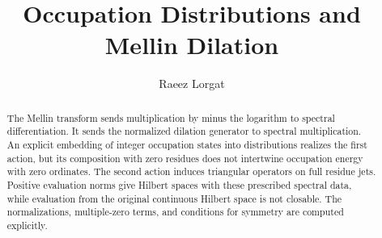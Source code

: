 \documentclass[11pt]{memoir}
\title{Occupation Distributions and Mellin Dilation}
\author{Raeez Lorgat}
\date{}
\begin{document}
\maketitle
\begin{abstract}
The Mellin transform sends multiplication by minus the logarithm to
spectral differentiation. It sends the normalized dilation generator
to spectral multiplication. An explicit embedding of integer
occupation states into distributions realizes the first action, but
its composition with zero residues does not intertwine occupation
energy with zero ordinates. The second action induces triangular
operators on full residue jets. Positive evaluation norms give
Hilbert spaces with these prescribed spectral data, while evaluation
from the original continuous Hilbert space is not closable. The
normalizations, multiple-zero terms, and conditions for symmetry are
computed explicitly.
\end{abstract}



\end{document}
